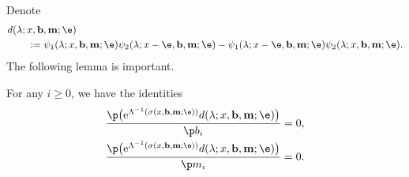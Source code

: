 Denote
\begin{align*}
&d(\lambda; x, {\bf b}, {\bf m};\e) \\
&\qquad{}:= \psi_1(\lambda; x, {\bf b}, {\bf m};\e) \psi_2(\lambda; x-\e, {\bf b}, {\bf m};\e)
- \psi_1(\lambda; x-\e, {\bf b}, {\bf m};\e) \psi_2(\lambda; x, {\bf b}, {\bf m};\e).
\end{align*}
The following lemma is important.
\begin{Lemma}\label{keylemma}
For any $i\ge0$, we have the identities
\begin{align}
& \frac{\p \bigl({\rm e}^{\Lambda^{-1}(\sigma(x,{\bf b},{\bf m};\e))}d(\lambda; x, {\bf b}, {\bf m};\e)\bigr)}{\p b_i} =0 , \label{id1} \\
& \frac{\p \bigl({\rm e}^{\Lambda^{-1}(\sigma(x,{\bf b},{\bf m};\e))}d(\lambda; x, {\bf b}, {\bf m};\e)\bigr)}{\p m_i} =0. \label{id2}
\end{align}
\end{Lemma}
